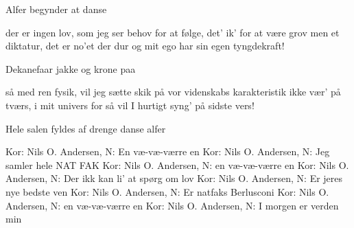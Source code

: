 \documentclass[a4paper,11pt]{article}
\begin{document}
\begin{song}
\scene Alfer begynder at danse

der er ingen lov, som jeg ser behov
for at følge, det' ik' for at være grov
men et diktatur, det er no'et der dur
og mit ego har sin egen tyngdekraft!

\scene Dekanefaar jakke og  krone paa

så med ren fysik, vil jeg sætte skik
på vor videnskabs karakteristik
ikke vær' på tværs, i mit univers
for så vil I hurtigt syng' på sidste vers!

\scene Hele salen fyldes af drenge danse alfer

Kor: Nils O. Andersen, N: En væ-væ-værre en
Kor: Nils O. Andersen, N: Jeg samler hele NAT FAK
Kor: Nils O. Andersen, N: en væ-væ-værre en 
Kor: Nils O. Andersen, N: Der ikk kan li' at spørg om lov
Kor: Nils O. Andersen, N: Er jeres nye bedste ven
Kor: Nils O. Andersen, N: Er natfaks Berlusconi
Kor: Nils O. Andersen, N: en væ-væ-værre en  
Kor: Nils O. Andersen, N: I morgen er verden min
 \end{song}
\end{document}
